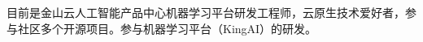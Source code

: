 

\begin{cvparagraph}
\begin{minipage}[t]{\textwidth}
目前是金山云人工智能产品中心机器学习平台研发工程师，云原生技术爱好者，参与社区多个开源项目。参与机器学习平台（KingAI）的研发。
\end{minipage}
\end{cvparagraph}
